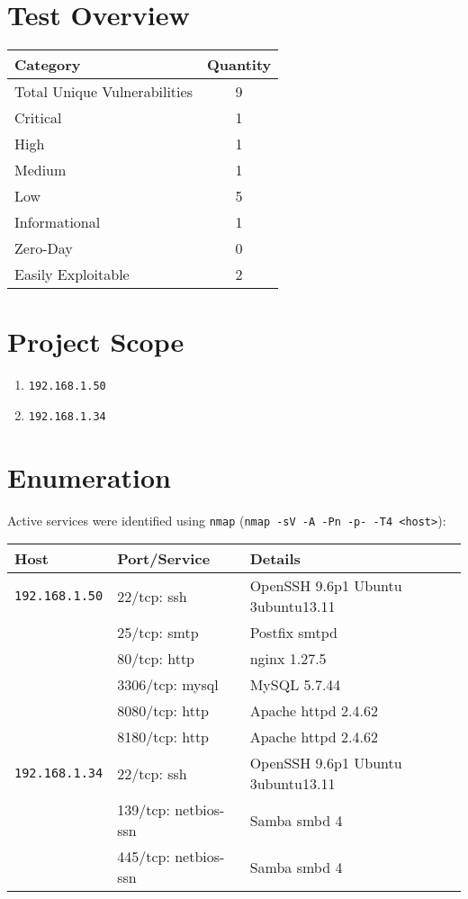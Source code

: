 \documentclass[a4paper,12pt]{article}
\begin{document}
\section{Test Overview}
\begin{table}[ht]
    \centering
    \begin{tabular}{lc}
        \toprule
        \rowcolor{gray!20} \textbf{Category} & \textbf{Quantity} \\
        \midrule
        Total Unique Vulnerabilities & 9 \\
        Critical & 1 \\
        High & 1 \\
        Medium & 1 \\
        Low & 5 \\
        Informational & 1 \\ \hline
        Zero-Day & 0 \\
        Easily Exploitable & 2 \\
        \bottomrule
    \end{tabular}
\end{table}

\section{Project Scope}
\begin{enumerate}
    \item \texttt{192.168.1.50}
    \item \texttt{192.168.1.34}
\end{enumerate}

\section{Enumeration}
Active services were identified using \texttt{nmap} (\texttt{nmap -sV -A -Pn -p- -T4 <host>}):
\begin{table}[ht]
    \centering
    \begin{tabular}{lll}
        \toprule
        \rowcolor{gray!20} \textbf{Host} & \textbf{Port/Service} & \textbf{Details} \\
        \midrule
        \texttt{192.168.1.50} 
            & 22/tcp: ssh & OpenSSH 9.6p1 Ubuntu 3ubuntu13.11 \\
            & 25/tcp: smtp & Postfix smtpd \\
            & 80/tcp: http & nginx 1.27.5 \\
            & 3306/tcp: mysql & MySQL 5.7.44 \\
            & 8080/tcp: http & Apache httpd 2.4.62 \\
            & 8180/tcp: http & Apache httpd 2.4.62 \\ \hline
        \texttt{192.168.1.34} 
            & 22/tcp: ssh & OpenSSH 9.6p1 Ubuntu 3ubuntu13.11 \\
            & 139/tcp: netbios-ssn & Samba smbd 4 \\
            & 445/tcp: netbios-ssn & Samba smbd 4 \\
        \bottomrule
    \end{tabular}
\end{table}
\end{document}
